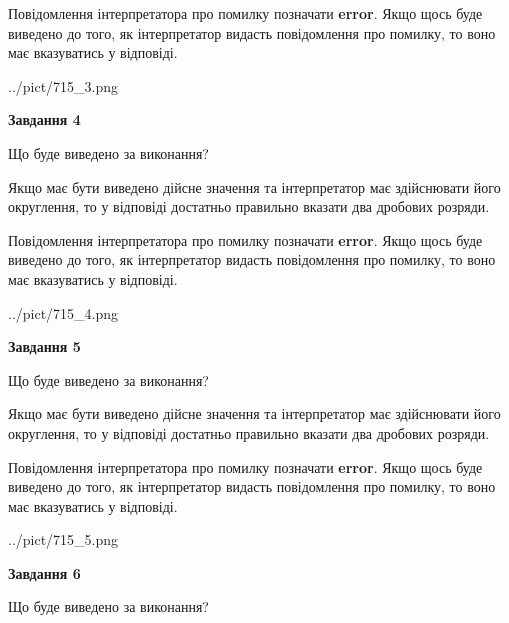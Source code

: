 \documentclass[12pt, ukrainian]{article}
\begin{document}
{\begin {Large}
Повідомлення інтерпретатора про помилку позначати \textbf{error}.
Якщо щось буде виведено до того, як інтерпретатор видасть повідомлення про помилку, 
то воно має вказуватись у відповіді. \par

\begin{center}
	{../pict/715_3.png}
\end{center}
\newpage

{\begin {center}\textbf{Завдання 4}\end {center}}\par
Що буде виведено за виконання? \par

Якщо має бути виведено дійсне значення та інтерпретатор має здійснювати його округлення, 
то у відповіді достатньо правильно вказати два дробових розряди.

Повідомлення інтерпретатора про помилку позначати \textbf{error}.
Якщо щось буде виведено до того, як інтерпретатор видасть повідомлення про помилку, 
то воно має вказуватись у відповіді. \par

\begin{center}
	{../pict/715_4.png}
\end{center}
\newpage

{\begin {center}\textbf{Завдання 5}\end {center}}\par
Що буде виведено за виконання? \par

Якщо має бути виведено дійсне значення та інтерпретатор має здійснювати його округлення, 
то у відповіді достатньо правильно вказати два дробових розряди.

Повідомлення інтерпретатора про помилку позначати \textbf{error}.
Якщо щось буде виведено до того, як інтерпретатор видасть повідомлення про помилку, 
то воно має вказуватись у відповіді. \par

\begin{center}
	{../pict/715_5.png}
\end{center}
\newpage

{\begin {center}\textbf{Завдання 6}\end {center}}\par
Що буде виведено за виконання? \par


\end{Large}}
\end{document}
